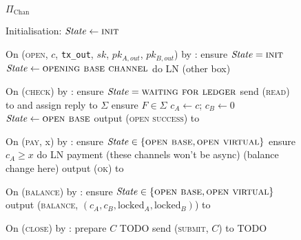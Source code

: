 \begin{figure}[H]
  \begin{protocolbox}{$\Pi_{\mathrm{Chan}}$}
    \begin{algorithmic}[1]
      \State Initialisation:
      \Indent
        \State $\mathit{State} \gets \textsc{init}$
      \EndIndent
      \Statex

      \State On (\textsc{open}, $c$, \texttt{tx\_out}, $sk$, $pk_{A, out}$,
      $pk_{B, out}$) by \environment:
      \Indent
        \State ensure $\mathit{State} = \textsc{init}$
        \State $\mathit{State} \gets \textsc{opening base channel}$
        \State do LN (other box) %
      \EndIndent
      \Statex

      \State On (\textsc{check}) by \environment:
      \Indent
        \State ensure $\mathit{State} = \textsc{waiting for ledger}$
        \State send (\textsc{read}) to \ledger and assign reply to $\Sigma$
        \State ensure $F \in \Sigma$
        \State $c_A \gets c$; $c_B \gets 0$ 
        \State $\mathit{State} \gets \textsc{open base}$
        \State output (\textsc{open success}) to \environment
      \EndIndent
      \Statex

      \State On (\textsc{pay}, x) by \environment:
      \Indent
        \State ensure $\mathit{State} \in \{\textsc{open base}, \textsc{open
        virtual}\}$
        \State ensure $c_A \geq x$
        \State do LN payment (these channels won't be async) (balance change
        here) %
        \State output (\textsc{ok}) to \environment
      \EndIndent
      \Statex

      \State On (\textsc{balance}) by \environment:
      \Indent
        \State ensure $\mathit{State} \in \{\textsc{open base}, \textsc{open
        virtual}\}$
        \State output (\textsc{balance}, $(c_A, c_B, \mathrm{locked}_A,
        \mathrm{locked}_B)$) to \environment %
      \EndIndent
      \Statex

      \State On (\textsc{close}) by \environment:
      \Indent
          \State prepare $C$ TODO
          \State send (\textsc{submit}, $C$) to \ledger
          \State TODO
        \EndIf
      \EndIndent
    \end{algorithmic}
  \end{protocolbox}
  \caption{}
  \label{code:protocol:chan:skeleton}
\end{figure}

